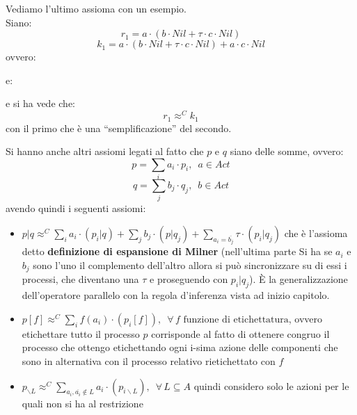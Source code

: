 \begin{esempio}
  Vediamo l'ultimo assioma con un esempio.\\
  Siano:
  \[r_1=a\cdot(b\cdot Nil+\tau\cdot c\cdot Nil)\]
  \[k_1=a\cdot(b\cdot Nil+\tau\cdot c\cdot Nil)+a\cdot c\cdot Nil\]
  ovvero:
  \begin{center}
  \end{center}
  \newpage
  e:
  \begin{center}
  \end{center}
  e si ha vede che:
  \[r_1\approx^C k_1\]
  con il primo che è una ``semplificazione'' del secondo.
\end{esempio}
Si hanno anche altri assiomi legati al fatto che $p$ e $q$ siano delle somme,
ovvero:
\[p=\sum_i a_i\cdot p_i,\,\,\, a\in Act\]
\[q=\sum_j b_j\cdot q_j,\,\,\, b\in Act\]
avendo quindi i seguenti assiomi:
\begin{itemize}
  \item $p|q\approx^C\sum_i a_i\cdot (p_i|q)+\sum_j b_j\cdot
  (p|q_j)+\sum_{a_i=\overline{b_j}}\tau\cdot(p_i|q_j)$ che è l'assioma detto
  \textbf{definizione di espansione di Milner} (nell'ultima parte Si ha se $a_i$ e
  $b_j$ sono l'uno il complemento dell'altro allora si può sincronizzare su di
  essi i processi, che diventano una $\tau$ e proseguendo con $p_i|q_j$). È la
  generalizzazione dell'operatore parallelo con la regola d'inferenza vista ad
  inizio capitolo.
  \item $p[f]\approx^C \sum_if(a_i)\cdot(p_i[f]),\,\,\,\forall\, f\mbox{ funzione
    di etichettatura}$, ovvero etichettare tutto il processo $p$ corrisponde al
  fatto di ottenere congruo il processo che ottengo etichettando ogni i-sima
  azione delle componenti che sono in alternativa con il processo relativo
  rietichettato con $f$
  \item $p_{\backslash L}\approx^C \sum_{a_i,\overline{a_i}\not\in
    L}a_i\cdot(p_{i\backslash L}),\,\,\,\forall\, L\subseteq A$ quindi considero
  solo le azioni per le quali non si ha al restrizione
\end{itemize}
